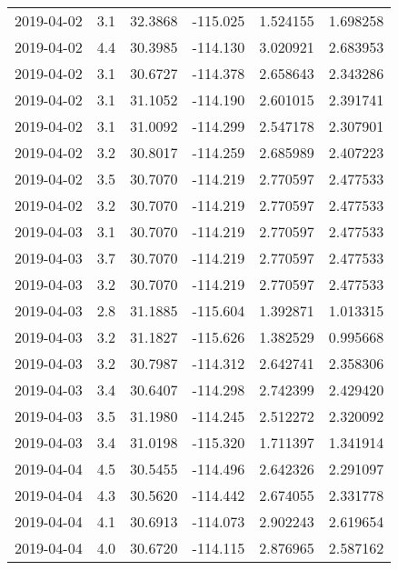 \begin{tabular}{lrrrrr}
2019-04-02 &       3.1 &  32.3868 &  -115.025 &         1.524155 &         1.698258 \\
2019-04-02 &       4.4 &  30.3985 &  -114.130 &         3.020921 &         2.683953 \\
2019-04-02 &       3.1 &  30.6727 &  -114.378 &         2.658643 &         2.343286 \\
2019-04-02 &       3.1 &  31.1052 &  -114.190 &         2.601015 &         2.391741 \\
2019-04-02 &       3.1 &  31.0092 &  -114.299 &         2.547178 &         2.307901 \\
2019-04-02 &       3.2 &  30.8017 &  -114.259 &         2.685989 &         2.407223 \\
2019-04-02 &       3.5 &  30.7070 &  -114.219 &         2.770597 &         2.477533 \\
2019-04-02 &       3.2 &  30.7070 &  -114.219 &         2.770597 &         2.477533 \\
2019-04-03 &       3.1 &  30.7070 &  -114.219 &         2.770597 &         2.477533 \\
2019-04-03 &       3.7 &  30.7070 &  -114.219 &         2.770597 &         2.477533 \\
2019-04-03 &       3.2 &  30.7070 &  -114.219 &         2.770597 &         2.477533 \\
2019-04-03 &       2.8 &  31.1885 &  -115.604 &         1.392871 &         1.013315 \\
2019-04-03 &       3.2 &  31.1827 &  -115.626 &         1.382529 &         0.995668 \\
2019-04-03 &       3.2 &  30.7987 &  -114.312 &         2.642741 &         2.358306 \\
2019-04-03 &       3.4 &  30.6407 &  -114.298 &         2.742399 &         2.429420 \\
2019-04-03 &       3.5 &  31.1980 &  -114.245 &         2.512272 &         2.320092 \\
2019-04-03 &       3.4 &  31.0198 &  -115.320 &         1.711397 &         1.341914 \\
2019-04-04 &       4.5 &  30.5455 &  -114.496 &         2.642326 &         2.291097 \\
2019-04-04 &       4.3 &  30.5620 &  -114.442 &         2.674055 &         2.331778 \\
2019-04-04 &       4.1 &  30.6913 &  -114.073 &         2.902243 &         2.619654 \\
2019-04-04 &       4.0 &  30.6720 &  -114.115 &         2.876965 &         2.587162 \\

\end{tabular}
